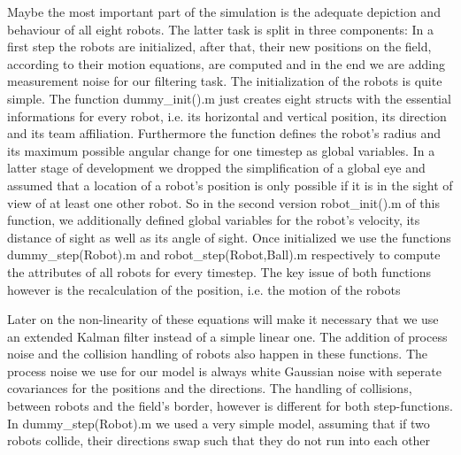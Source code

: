Maybe the most important part of the simulation is the adequate depiction and behaviour of all eight robots. The latter task is split in three components: In a first step the robots are initialized, after that, their new positions on the field, according to their motion equations, are computed and in the end we are adding measurement noise for our filtering task. The initialization of the robots is quite simple. The function {\selectfont dummy\_init().m} just creates eight structs with the essential informations for every robot, i.e. its horizontal and vertical position, its direction and its team affiliation. Furthermore the function defines the robot's radius and its maximum possible angular change for one timestep as global variables. In a latter stage of development we dropped the simplification of a global eye and assumed that a location of a robot's position is only possible if it is in the sight of view of at least one other robot. So in the second version {\selectfont robot\_init().m} of this function, we additionally defined global variables for the robot's velocity, its distance of sight as well as its angle of sight. Once initialized we use the functions {\selectfont dummy\_step(Robot).m} and {\selectfont robot\_step(Robot,Ball).m} respectively to compute the attributes of all robots for every timestep. The key issue of both functions however is the recalculation of the position, i.e. the motion of the robots


\parskip 20pt

Later on the non-linearity of these equations will make it necessary that we use an extended Kalman filter instead of a simple linear one. The addition of process noise and the collision handling of robots also happen in these functions. The process noise we use for our model is always white Gaussian noise with seperate covariances for the positions and the directions. The handling of collisions, between robots and the field's border, however is different for both step-functions. In {\selectfont dummy\_step(Robot).m} we used a very simple model, assuming that if two robots collide, their directions swap such that they do not run into each other


 
